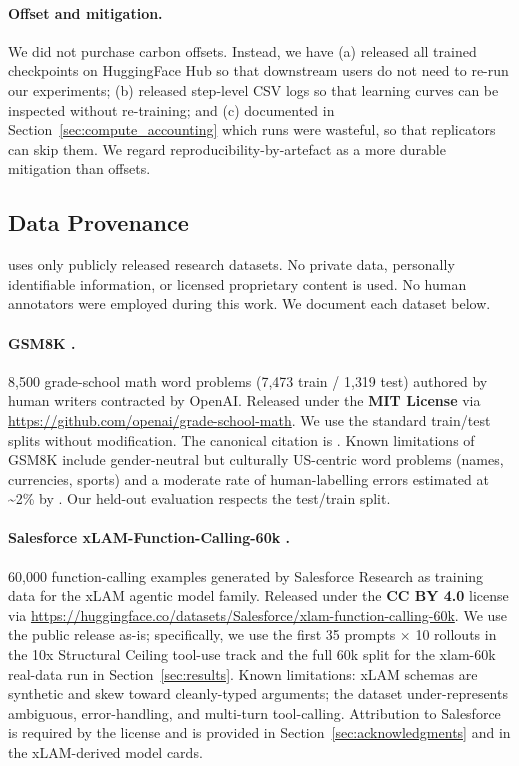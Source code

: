 \paragraph{Offset and mitigation.}
We did not purchase carbon offsets. Instead, we have (a) released all
trained checkpoints on HuggingFace Hub so that downstream users do not
need to re-run our experiments; (b) released step-level CSV logs so that
learning curves can be inspected without re-training; and (c) documented
in Section~\ref{sec:compute_accounting} which runs were wasteful, so that
replicators can skip them. We regard reproducibility-by-artefact as a
more durable mitigation than offsets.

\subsection{Data Provenance}
\label{sec:provenance}

\ours{} uses only publicly released research datasets. No private data,
personally identifiable information, or licensed proprietary content is
used. No human annotators were employed during this work. We document
each dataset below.

\paragraph{GSM8K \cite{cobbe2021training}.}
8{,}500 grade-school math word problems (7{,}473 train / 1{,}319 test)
authored by human writers contracted by OpenAI. Released under the
\textbf{MIT License} via \url{https://github.com/openai/grade-school-math}.
We use the standard train/test splits without modification. The canonical
citation is \citet{cobbe2021training}. Known limitations of GSM8K include
gender-neutral but culturally US-centric word problems (names, currencies,
sports) and a moderate rate of human-labelling errors estimated at
\textasciitilde 2\% by \cite{zhang2024gsm1k}. Our held-out evaluation
respects the test/train split.

\paragraph{Salesforce xLAM-Function-Calling-60k \cite{liu2024xlam}.}
60{,}000 function-calling examples generated by Salesforce Research as
training data for the xLAM agentic model family. Released under the
\textbf{CC BY 4.0} license via \url{https://huggingface.co/datasets/Salesforce/xlam-function-calling-60k}.
We use the public release as-is; specifically, we use the first 35 prompts
$\times$ 10 rollouts in the 10x Structural Ceiling tool-use track and the
full 60k split for the xlam-60k real-data run in Section~\ref{sec:results}.
Known limitations: xLAM schemas are synthetic and skew toward cleanly-typed
arguments; the dataset under-represents ambiguous, error-handling, and
multi-turn tool-calling. Attribution to Salesforce is required by the
license and is provided in Section~\ref{sec:acknowledgments} and in the
xLAM-derived model cards.


